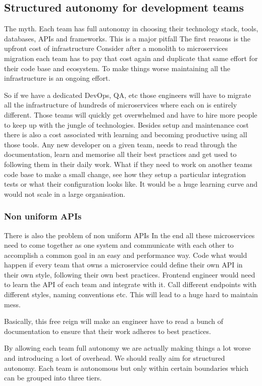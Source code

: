 \subsection{Structured autonomy for development teams}
The myth.
Each team has full autonomy in choosing their technology stack, tools, databases, APIs and frameworks.
This is a major pitfall
The first reasons is the upfront cost of infrastructure
Consider after a monolith to microservices migration each team has to pay that cost again and duplicate that same effort for their code base and ecosystem.
To make things worse maintaining all the infrastructure is an ongoing effort.

So if we have a dedicated DevOps, QA, etc those engineers will have to migrate all the infrastructure of hundreds of microservices where each on is entirely different.
Those teams will quickly get overwhelmed and have to hire more people to keep up with the jungle of technologies.
Besides setup and maintenance cost there is also a cost associated with learning and becoming productive using all those tools.
Any new developer on a given team, needs to read through the documentation, learn and memorise all their best practices and get used to following them in their daily work.
What if they need to work on another teams code base to make a small change, see how they setup a particular integration tests or what their configuration looks like.
It would be a huge learning curve and would not scale in a large organisation.

\subsubsection{Non uniform APIs}
There is also the problem of non uniform APIs
In the end all these microservices need to come together as one system and communicate with each other to accomplish a common goal in an easy and performance way.
Code what would happen if every team that owns a microservice could define their own API in their own style, following their own best practices.
Frontend engineer would need to learn the API of each team and integrate with it.
Call different endpoints with different styles, naming conventions etc.
This will lead to a huge hard to maintain mess.

Basically, this free reign will make an engineer have to read a bunch of documentation to ensure that their work adheres to best practices.

By allowing each team full autonomy we are actually making things a lot worse and introducing a lost of overhead.
We should really aim for structured autonomy.
Each team is autonomous but only within certain boundaries which can be grouped into three tiers.

